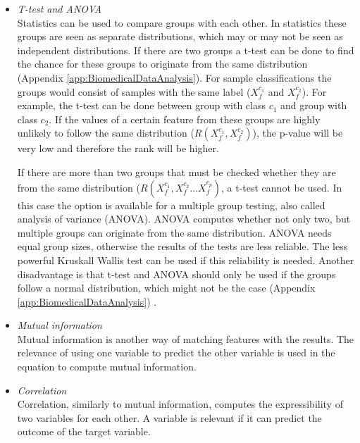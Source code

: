 \documentclass[10pt,a4paper]{report}
\begin{document}
	\begin{itemize}
		\item \textit{T-test and ANOVA} \\ 
		Statistics can be used to compare groups with each other. In statistics these groups are seen as separate distributions, which may or may not be seen as independent distributions. If there are two groups  a t-test can be done to find the chance for these groups to originate from the same distribution \cite{heiberger2004statistical} (Appendix \ref{app:BiomedicalDataAnalysis}). 
		For sample classifications the groups would consist of samples with the same label ($X_{f}^{c_1}$  and $X_{f}^{c_2}$). For example, the t-test can be done between group with class $c_1$ and group with class $c_2$. If the values of a certain feature from these groups are highly unlikely to follow the same distribution ($R(X_{f}^{c_1}, X_{f}^{c_2})$), the p-value will be very low and therefore the rank will be higher.
		
		If there are more than two groups that must be checked whether they are from the same distribution ($R(X_{f}^{c_1}, X_{f}^{c_2} ... X_{f}^{c_p})$, a t-test cannot be used. In this case the option is available for a multiple group testing, also called analysis of variance (ANOVA). ANOVA computes whether not only two, but multiple groups can originate from the same distribution. ANOVA needs equal group sizes, otherwise the results of the tests are less reliable. The less powerful Kruskall Wallis test can be used if this reliability is needed. Another disadvantage is that t-test and ANOVA should only be used if the groups follow a normal distribution, which might not be the case (Appendix \ref{app:BiomedicalDataAnalysis}) \cite{heiberger2004statistical}.
		
		\item \textit{Mutual information} \\
		Mutual information is another way of matching features with the results. The relevance of using one variable to predict the other variable is used in the equation to compute mutual information. 
		
		\item \textit{Correlation} \\
		Correlation, similarly to mutual information, computes the expressibility of two variables for each other. A variable is relevant if it can predict the outcome of the target variable.
		
	\end{itemize}
	
\end{document}
